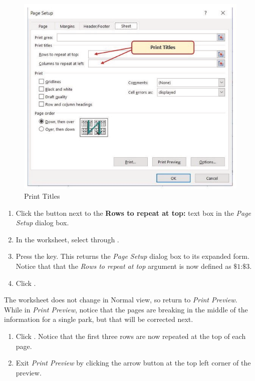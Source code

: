 \begin{figure}[H]
	\centering
	\includegraphics[width=\maxwidth{.95\linewidth}]{gfx/ch03_fig29}
	\caption{Print Titles}
	\label{03:fig29}
\end{figure}

\begin{enumerate}[resume]
	\item Click the  button next to the \textbf{Rows to repeat at top:} text box in the \textit{Page Setup} dialog box.
	\item In the worksheet, select   through .
	\item Press the  key. This returns the \textit{Page Setup} dialog box to its expanded form. Notice that that the \textit{Rows to repeat at top} argument is now defined as $ \$1 $:$ \$3 $.
	\item Click .
\end{enumerate}

The worksheet does not change in Normal view, so return to \textit{Print Preview}. While in \textit{Print Preview}, notice that the pages are breaking in the middle of the information for a single park, but that will be corrected next.

\begin{enumerate}
	\item Click . Notice that the first three rows are now repeated at the top of each page.
	\item Exit \textit{Print Preview} by clicking the arrow button at the top left corner of the preview.
\end{enumerate}


